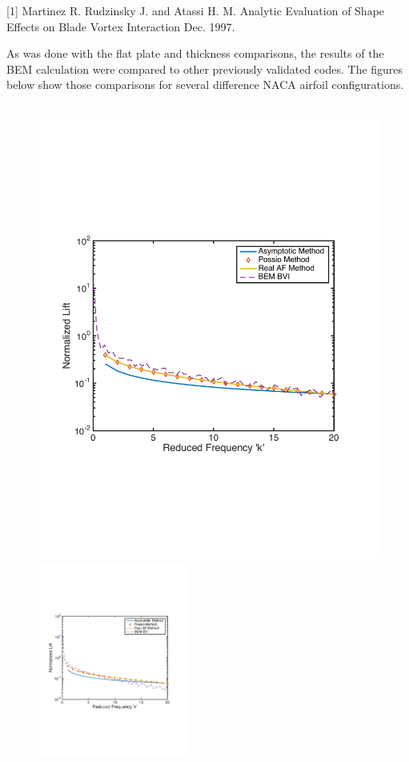\documentclass{article}
\begin{document}
[1] Martinez  R.   Rudzinsky  J.   and Atassi  H.  M.    Analytic Evaluation of Shape Effects on Blade Vortex Interaction  Dec.  1997.

\newpage

\noindent As was done with the flat plate and thickness comparisons, the results of the BEM calculation were compared to other previously validated codes. The figures below show those comparisons for several difference NACA airfoil configurations. \\ \\ 

\begin{figure}[h]
\centering
\begin{minipage}{0.5\textwidth}
	\centering
	\includegraphics[width = 3.5 in, height = 2.5 in]{NACA1101}
\end{minipage}%
\begin{minipage}{0.5\textwidth}
	\centering
	\includegraphics[width = 3.4 in, height = 2.5in]{NACA2101}
\end{minipage}%
\end{figure}
\end{document}
